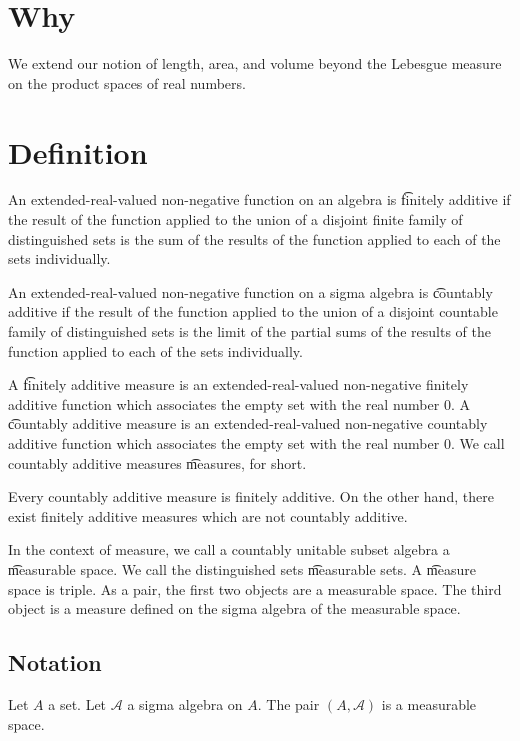 

\section*{Why}

We extend our notion of length, area, and volume beyond the Lebesgue measure on the product spaces of real numbers.

\section*{Definition}

An extended-real-valued non-negative function on an algebra is \t{finitely additive} if the result of the function applied to the union of a disjoint finite family of distinguished sets is the sum of the results of the function applied to each of the sets individually.

An extended-real-valued non-negative function on a sigma algebra is \t{countably additive} if the result of the function applied to the union of a disjoint countable family of distinguished sets is the limit of the partial sums of the results of the function applied to each of the sets individually.

A \t{finitely additive measure} is an extended-real-valued non-negative finitely additive function which associates the empty set with the real number $0$.
A \t{countably additive measure} is an extended-real-valued non-negative countably additive function which associates the empty set with the real number $0$.
We call countably additive measures \t{measures}, for short.

Every countably additive measure is finitely additive.
On the other hand, there exist finitely additive measures which are not countably additive.

In the context of measure, we call a countably unitable subset algebra a \t{measurable space}.
We call the distinguished sets \t{measurable} sets.
A \t{measure space} is triple.
As a pair, the first two objects are a measurable space.
The third object is a measure defined on the sigma algebra of the measurable space.

\subsection*{Notation}

Let $A$ a set.
Let $\mathcal{A} $ a sigma algebra on $A$.
The pair $(A, \mathcal{A} )$ is a measurable space.

